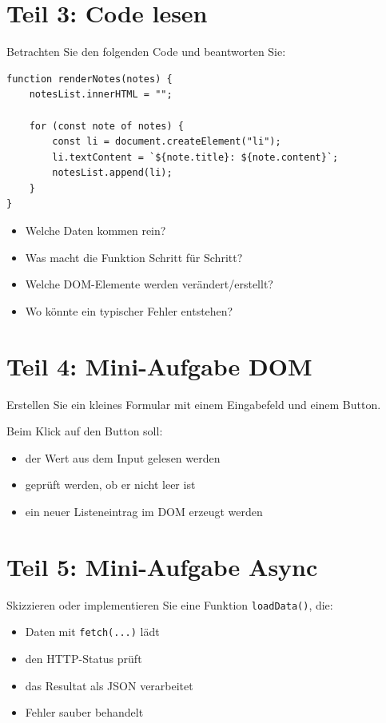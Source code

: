 \documentclass[a4paper,12pt]{article}
\begin{document}
\section{Teil 3: Code lesen}

Betrachten Sie den folgenden Code und beantworten Sie:

\begin{verbatim}
function renderNotes(notes) {
    notesList.innerHTML = "";

    for (const note of notes) {
        const li = document.createElement("li");
        li.textContent = `${note.title}: ${note.content}`;
        notesList.append(li);
    }
}
\end{verbatim}

\begin{itemize}
    \item Welche Daten kommen rein?
    \item Was macht die Funktion Schritt für Schritt?
    \item Welche DOM-Elemente werden verändert/erstellt?
    \item Wo könnte ein typischer Fehler entstehen?
\end{itemize}

\section{Teil 4: Mini-Aufgabe DOM}

Erstellen Sie ein kleines Formular mit einem Eingabefeld und einem Button.

Beim Klick auf den Button soll:
\begin{itemize}
    \item der Wert aus dem Input gelesen werden
    \item geprüft werden, ob er nicht leer ist
    \item ein neuer Listeneintrag im DOM erzeugt werden
\end{itemize}

\section{Teil 5: Mini-Aufgabe Async}

Skizzieren oder implementieren Sie eine Funktion \texttt{loadData()}, die:
\begin{itemize}
    \item Daten mit \texttt{fetch(...)} lädt
    \item den HTTP-Status prüft
    \item das Resultat als JSON verarbeitet
    \item Fehler sauber behandelt
\end{itemize}
\end{document}
